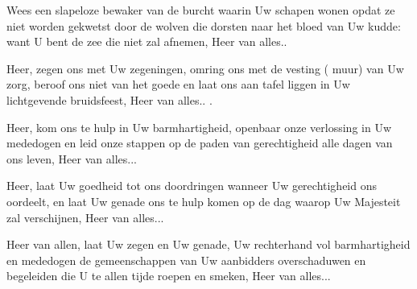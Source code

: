 \documentclass[12pt,twoside,a5paper]{article}
\begin{document}
 Wees een slapeloze bewaker van de burcht waarin Uw schapen wonen opdat ze niet worden gekwetst door de wolven die dorsten naar het bloed van Uw kudde: want U bent de zee die niet zal afnemen, Heer van alles..

 Heer, zegen ons met Uw zegeningen, omring ons met de vesting ( muur) van Uw zorg, beroof ons niet van het goede en laat ons aan tafel liggen in Uw lichtgevende bruidsfeest, Heer van alles.. .

 Heer, kom ons te hulp in Uw barmhartigheid, openbaar onze verlossing in Uw mededogen en leid onze stappen op de paden van gerechtigheid alle dagen van ons leven, Heer van alles...

 Heer, laat Uw goedheid tot ons doordringen wanneer Uw gerechtigheid ons oordeelt, en laat Uw genade ons te hulp komen op de dag waarop Uw Majesteit zal verschijnen, Heer van alles...

 Heer van allen, laat Uw zegen en Uw genade, Uw rechterhand vol barmhartigheid en mededogen de gemeenschappen van Uw aanbidders overschaduwen en begeleiden die U te allen tijde roepen en smeken, Heer van alles...

\end{document}
